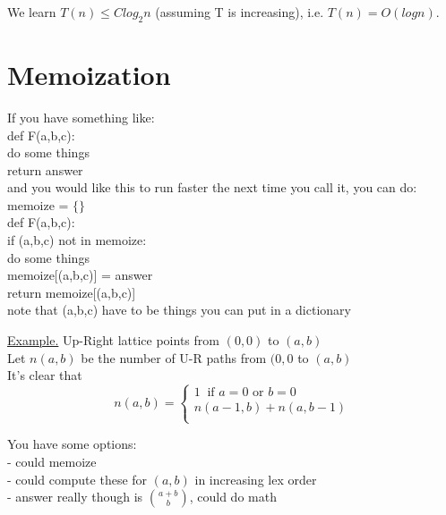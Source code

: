 \documentclass[12pt]{amsart}
\begin{document}
We learn $T(n) \leq Clog_2n$ (assuming T is increasing), i.e. $T(n) = O(logn)$.


\hrulefill

\section{Memoization}

If you have something like:\\

def F(a,b,c):\\
\indent \indent \indent do some things\\
\indent \indent \indent return answer\\

and you would like this to run faster the next time you call it, you can do:\\

memoize = $\{\}$\\
def F(a,b,c):\\
\indent \indent \indent if (a,b,c) not in memoize:\\
\indent \indent \indent \indent \indent \indent do some things\\
\indent \indent \indent \indent \indent \indent memoize[(a,b,c)] = answer\\
\indent \indent \indent return memoize[(a,b,c)]\\

note that (a,b,c) have to be things you can put in a dictionary\\

\vspace{10mm}

\underline{Example.} Up-Right lattice points from $(0,0)$ to $(a,b)$\\

Let $n(a,b)$ be the number of U-R paths from $(0,0$ to $(a,b)$\\

It's clear that\\


$$ 
	n(a,b) = 
	\begin{cases}
	1 \;\; \text{if $a = 0$ or $b = 0$}\\
	n(a-1,b)+n(a,b-1) \\
	\end{cases}
$$

You have some options:\\
- could memoize\\
- could compute these for $(a,b)$ in increasing lex order\\
- answer really though is ${a+b \choose b}$, could do math\\
\end{document}
